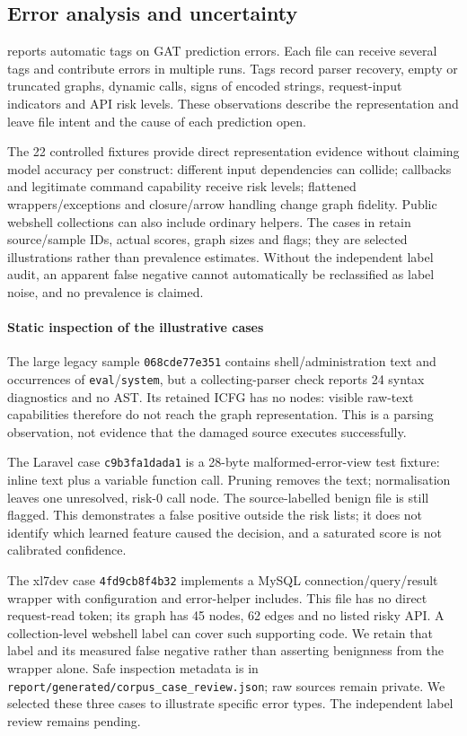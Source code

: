 \subsection{Error analysis and uncertainty}\label{sec:errors}
 reports automatic tags on GAT prediction errors. Each file can receive several tags
and contribute errors in multiple runs. Tags record parser recovery, empty or truncated graphs, dynamic
calls, signs of encoded strings, request-input indicators and API risk levels. These observations describe
the representation and leave file intent and the cause of each prediction open.

The 22 controlled fixtures provide direct representation evidence without claiming model accuracy per construct:
different input dependencies can collide; callbacks and legitimate command capability receive risk levels;
flattened wrappers/exceptions and closure/arrow handling change graph fidelity.
Public webshell collections can also include ordinary helpers. The cases in  retain source/sample IDs, actual scores, graph sizes and flags; they are selected illustrations rather than prevalence estimates.
Without the independent label audit,
an apparent false negative cannot automatically be reclassified as label noise, and no prevalence is claimed.

\paragraph{Static inspection of the illustrative cases}
The large legacy sample \texttt{068cde77e351} contains shell/administration text and occurrences of
\texttt{eval}/\texttt{system}, but a collecting-parser check reports 24 syntax diagnostics and no AST.
Its retained ICFG has no nodes: visible raw-text capabilities therefore do not reach the graph representation.
This is a parsing observation, not evidence that the damaged source executes successfully.

The Laravel case \texttt{c9b3fa1dada1} is a 28-byte malformed-error-view test fixture: inline text plus a
variable function call. Pruning removes the text; normalisation leaves one unresolved, risk-0 call node.
The source-labelled benign file is still flagged. This demonstrates a false positive outside the risk lists;
it does not identify which learned feature caused the decision, and a saturated score is not calibrated confidence.

The xl7dev case \texttt{4fd9cb8f4b32} implements a MySQL connection/query/result wrapper with configuration
and error-helper includes. This file has no direct request-read token; its graph has 45 nodes, 62 edges and
no listed risky API. A collection-level webshell label can cover such supporting code. We retain that label
and its measured false negative rather than asserting benignness from the wrapper alone.
Safe inspection metadata is in \texttt{report/generated/corpus\_case\_review.json}; raw sources remain private.
We selected these three cases to illustrate specific error types. The independent label review remains pending.

